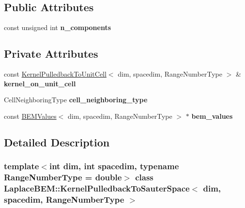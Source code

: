 \subsection*{Public Attributes}
\begin{DoxyCompactItemize}
\item 
\mbox{\label{classLaplaceBEM_1_1KernelPulledbackToSauterSpace_a8e401c7c6e032c8cd25f45f404179319}} 
const unsigned int {\bfseries n\+\_\+components}
\end{DoxyCompactItemize}
\subsection*{Private Attributes}
\begin{DoxyCompactItemize}
\item 
\mbox{\label{classLaplaceBEM_1_1KernelPulledbackToSauterSpace_af9313eea69535eb0e01ead937e9028c0}} 
const \hyperlink{classLaplaceBEM_1_1KernelPulledbackToUnitCell}{Kernel\+Pulledback\+To\+Unit\+Cell}$<$ dim, spacedim, Range\+Number\+Type $>$ \& {\bfseries kernel\+\_\+on\+\_\+unit\+\_\+cell}
\item 
\mbox{\label{classLaplaceBEM_1_1KernelPulledbackToSauterSpace_aa9e897f0e63f3c7ee5009c07e66cbd56}} 
Cell\+Neighboring\+Type {\bfseries cell\+\_\+neighboring\+\_\+type}
\item 
\mbox{\label{classLaplaceBEM_1_1KernelPulledbackToSauterSpace_a5bcaf6a268588034723b37b4bd858476}} 
const \hyperlink{classLaplaceBEM_1_1BEMValues}{B\+E\+M\+Values}$<$ dim, spacedim, Range\+Number\+Type $>$ $\ast$ {\bfseries bem\+\_\+values}
\end{DoxyCompactItemize}


\subsection{Detailed Description}
\subsubsection*{template$<$int dim, int spacedim, typename Range\+Number\+Type = double$>$\newline
class Laplace\+B\+E\+M\+::\+Kernel\+Pulledback\+To\+Sauter\+Space$<$ dim, spacedim, Range\+Number\+Type $>$}


